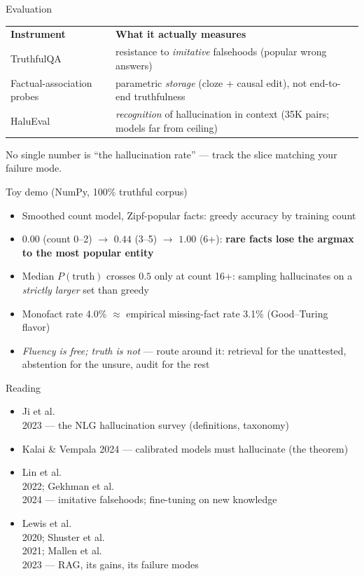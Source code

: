 \documentclass[aspectratio=169,11pt]{beamer}
\begin{document}
\begin{frame}{Evaluation}
\begin{table}
\begin{tabular}{lp{7.6cm}}
\textbf{Instrument} & \textbf{What it actually measures} \\
TruthfulQA & resistance to \emph{imitative} falsehoods (popular wrong answers) \\
Factual-association probes & parametric \emph{storage} (cloze + causal edit), not end-to-end truthfulness \\
HaluEval & \emph{recognition} of hallucination in context (35K pairs; models far from ceiling) \\
\end{tabular}
\end{table}
\vspace{0.5em}
No single number is ``the hallucination rate'' --- track the slice matching your failure mode.
\end{frame}

\begin{frame}{Toy demo (NumPy, 100\% truthful corpus)}
\begin{itemize}
\item Smoothed count model, Zipf-popular facts: greedy accuracy by training count
\item $0.00$ (count 0--2) $\to$ $0.44$ (3--5) $\to$ $1.00$ (6+): \textbf{rare facts lose the argmax to the most popular entity}
\item Median $P(\text{truth})$ crosses $0.5$ only at count 16+: sampling hallucinates on a \emph{strictly larger} set than greedy
\item Monofact rate 4.0\% $\approx$ empirical missing-fact rate 3.1\% (Good--Turing flavor)
\item \emph{Fluency is free; truth is not} --- route around it: retrieval for the unattested, abstention for the unsure, audit for the rest
\end{itemize}
\end{frame}

\begin{frame}{Reading}
\begin{itemize}
\item Ji et al.\\ 2023 --- the NLG hallucination survey (definitions, taxonomy)
\item Kalai \& Vempala 2024 --- calibrated models must hallucinate (the theorem)
\item Lin et al.\\ 2022; Gekhman et al.\\ 2024 --- imitative falsehoods; fine-tuning on new knowledge
\item Lewis et al.\\ 2020; Shuster et al.\\ 2021; Mallen et al.\\ 2023 --- RAG, its gains, its failure modes
\end{itemize}
\end{frame}
\end{document}
